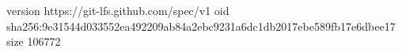 version https://git-lfs.github.com/spec/v1
oid sha256:9e31544d033552ea492209ab84a2ebc9231a6dc1db2017ebe589fb17e6dbee17
size 106772
